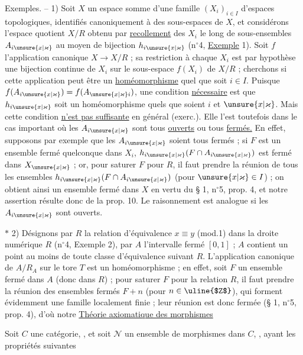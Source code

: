 Exemples. -- 1) Soit $X$ un espace somme d'une famille $(X_i)_{i\in I}$ d'espaces topologiques, identifiés canoniquement à des sous-espaces de $X$, et considérons l'espace quotient $X/R$ obtenu par \uline{recollement} des $X_i$ le long de sous-ensembles $A_{i\unsure{x|\varkappa}}$ au moyen de bijection $h_{i\unsure{x|\varkappa}}$ (n$^{\circ}$4, \uline{Exemple} 1). Soit $f$ l'application canonique $X\to X/R$ ; sa restriction à chaque $X_i$ est par hypothèse une bijection continue de $X_i$ sur le sous-espace $f(X_i)$ de $X/R$ ; cherchons si cette application peut être un \uline{homéomorphisme} quel que soit $i\in I$. Puisque $f(A_{i\unsure{x|\varkappa}})=f(A_{\unsure{x|\varkappa}i})$, une condition \uline{nécessaire} est que $h_{i\unsure{x|\varkappa}}$ soit un homéomorphisme quels que soient $i$ et $\unsure{x|\varkappa}$. Mais cette condition \uline{n'est pas suffisante} en général (exerc.\quad). Elle l'est toutefois dans le cas important où les $A_{i\unsure{x|\varkappa}}$ sont tous \uline{ouverts} ou tous \uline{fermés.} En effet, supposons par exemple que les $A_{i\unsure{x|\varkappa}}$ soient tous fermés ; si $F$ est un ensemble fermé quelconque dans $X_i$, $h_{i\unsure{x|\varkappa}}(F\cap A_{i\unsure{x|\varkappa}})$ est fermé dans $X_{\unsure{x|\varkappa}}$ ; or, pour saturer $F$ pour $R$, il faut prendre la réunion de tous les ensembles $h_{i\unsure{x|\varkappa}}(F\cap A_{i\unsure{x|\varkappa}})$ (pour $\unsure{x|\varkappa}\in I$) ; on obtient ainsi un ensemble fermé dans $X$ en vertu du § 1, n$^{\circ}$5, prop. 4, et notre assertion résulte donc de la prop. 10. Le raisonnement est analogue si les $A_{i\unsure{x|\varkappa}}$ sont ouverts.

$*$ 2) Désignons par $R$ la relation d'équivalence $x\equiv y$ (mod.1) dans la droite numérique \uline{$R$} (n$^{\circ}$4, Exemple 2), par $A$ l'intervalle fermé $[0,1]$ ; $A$ contient un point au moins de toute classe d'équivalence suivant $R$. L'application canonique de $A/R_A$ sur le tore \uline{$T$} est un homéomorphisme ; en effet, soit $F$ un ensemble fermé dans $A$ (donc dans \uline{$R$}) ; pour saturer $F$ pour la relation $R$, il faut prendre la réunion des ensembles fermés $F+n$ (pour $n\in\text{\uline{$Z$}}$), qui forment évidemment une famille localement finie ; leur réunion est donc fermée (§ 1, n$^{\circ}$5, prop. 4), d'où notre
\uline{Théorie axiomatique des morphismes }

Soit $C$ une catégorie, , et soit $\mathcal{N}$ un ensemble de morphismes dans $C$, , ayant les propriétés suivantes

